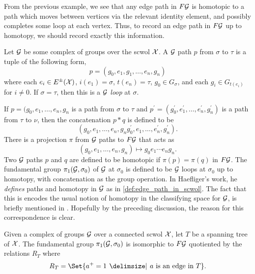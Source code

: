 From the previous example, we see that any edge path in $F\mathcal{G}$ is homotopic to a path which moves between vertices via the relevant identity element, and possibly completes some loop at each vertex.
Thus, to record an edge path in $F\mathcal{G}$ up to homotopy, we should record exactly this information.

\begin{definition}
	Let $\mathcal{G}$ be some complex of groups over the scwol $\mathcal{X}$.
	A $\mathcal{G}$ path $p$ from $\sigma$ to  $\tau$ is a tuple of the following form,
	\[
		p = (g_0, e_1, g_1, \ldots ,e_n, g_n)
	\]
	where each $e_i \in E^\pm(\mathcal{X})$, $i(e_1) = \sigma$, $t(e_n)=\tau$, $g_0 \in G_\sigma$, and each $g_i \in G_{t(e_i)}$ for  $i \neq 0$.
	If $\sigma=\tau$, then this is a \emph{ $\mathcal{G}$ loop} at  $\sigma$.
	\label{def:paths_in_complexes_of_groups}
\end{definition}

If $p = (g_0, e_1, \ldots, e_n, g_n$ is a path from $\sigma$ to  $\tau$ and  $p^\prime = (g^\prime_0, e^\prime_1, \ldots, e^\prime_n, g^\prime_n)$ is a path from $\tau$ to $\nu$, then the concatenation  $p \ast q$ is defined to be
\[
	(g_0, e_1, \ldots, e_n, g_ng^\prime_0, e_1, \ldots, e^\prime_n, g^\prime_n)
	.\]
There is a projection $\pi$ from $\mathcal{G}$ paths to $F\mathcal{G}$ that acts as
\[
	(g_0, e_1, \ldots, e_n, g_n) \mapsto g_0e_1\cdots e_ng_n
	.\]
Two $\mathcal{G}$ paths  $p$ and $q$ are defined to be homotopic if $\pi(p) = \pi(q)$ in $F\mathcal{G}$.
The fundamental group $\pi_1(\mathcal{G}, \sigma_0)$ of $\mathcal{G}$ at $\sigma_0$ is defined to be $\mathcal{G}$ loops at  $\sigma_0$ up to homotopy, with concatenation as the group operation.
In Haefliger's work, he \emph{defines} paths and homotopy in $\mathcal{G}$ as in \cref{def:edge_path_in_scwol}.
The fact that this is encodes the usual notion of homotopy in the classifying space for $\mathcal{G}$, is briefly mentioned in \cite[Section 3.1.a]{haefliger_complexes_1991}.
Hopefully by the preceding discussion, the reason for this correspondence is clear.
\begin{theorem}
	Given a complex of groups $\mathcal{G}$ over a connected scwol  $\mathcal{X}$, let $T$ be a spanning tree of  $\mathcal{X}$.
	The fundamental group  $\pi_1(\mathcal{G}, \sigma_0)$ is isomorphic to $F\mathcal{G}$ quotiented by the relations  $R_T$ where
	\[
		R_T = \Set{a^+ = 1 \given a \text{ is an edge in } T}
		.\]
\end{theorem}
